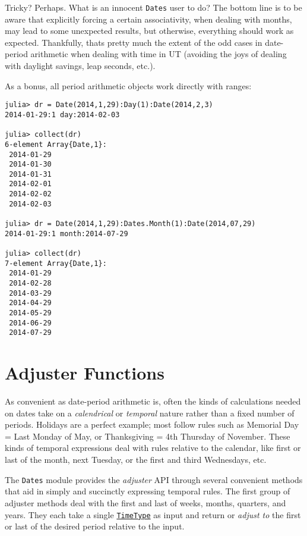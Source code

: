 Tricky? Perhaps. What is an innocent \texttt{Dates} user to do? The bottom line is to be aware that explicitly forcing a certain associativity, when dealing with months, may lead to some unexpected results, but otherwise, everything should work as expected. Thankfully, that{\textquotesingle}s pretty much the extent of the odd cases in date-period arithmetic when dealing with time in UT (avoiding the {\textquotedbl}joys{\textquotedbl} of dealing with daylight savings, leap seconds, etc.).



As a bonus, all period arithmetic objects work directly with ranges:




\begin{verbatim}
julia> dr = Date(2014,1,29):Day(1):Date(2014,2,3)
2014-01-29:1 day:2014-02-03

julia> collect(dr)
6-element Array{Date,1}:
 2014-01-29
 2014-01-30
 2014-01-31
 2014-02-01
 2014-02-02
 2014-02-03

julia> dr = Date(2014,1,29):Dates.Month(1):Date(2014,07,29)
2014-01-29:1 month:2014-07-29

julia> collect(dr)
7-element Array{Date,1}:
 2014-01-29
 2014-02-28
 2014-03-29
 2014-04-29
 2014-05-29
 2014-06-29
 2014-07-29
\end{verbatim}



\hypertarget{13551592780469201884}{}


\section{Adjuster Functions}



As convenient as date-period arithmetic is, often the kinds of calculations needed on dates take on a \emph{calendrical} or \emph{temporal} nature rather than a fixed number of periods. Holidays are a perfect example; most follow rules such as {\textquotedbl}Memorial Day = Last Monday of May{\textquotedbl}, or {\textquotedbl}Thanksgiving = 4th Thursday of November{\textquotedbl}. These kinds of temporal expressions deal with rules relative to the calendar, like first or last of the month, next Tuesday, or the first and third Wednesdays, etc.



The \texttt{Dates} module provides the \emph{adjuster} API through several convenient methods that aid in simply and succinctly expressing temporal rules. The first group of adjuster methods deal with the first and last of weeks, months, quarters, and years. They each take a single \hyperlink{4438614350756187528}{\texttt{TimeType}} as input and return or \emph{adjust to} the first or last of the desired period relative to the input.




